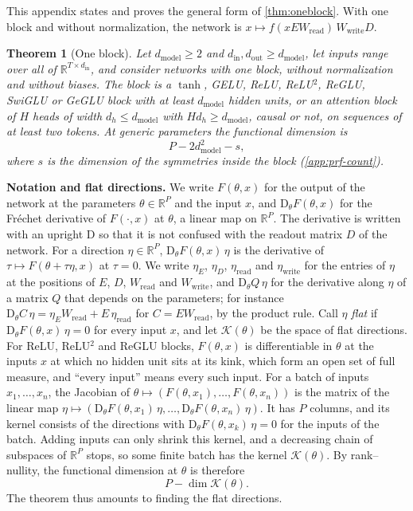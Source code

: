 \documentclass[10pt]{article}
\newtheorem{theorem}{Theorem}[section]
\theoremstyle{definition}
\theoremstyle{remark}
\newcommand{\R}{\mathbb{R}}
\newcommand{\Wread}{W_{\mathrm{read}}}
\newcommand{\Wwrite}{W_{\mathrm{write}}}
\newcommand{\dm}{d_{\mathrm{model}}}
\newcommand{\Der}{\mathrm{D}}
\newcommand{\para}[1]{\smallskip\noindent\textbf{#1}\hspace{0.5em}}
\begin{document}
This appendix states and proves the general form of \cref{thm:oneblock}. With one block and without normalization, the network is $x \mapsto f(xE\Wread)\,\Wwrite D$.

\begin{theorem}[One block]\label{thm:onelayer}
Let $\dm \ge 2$ and $d_{\mathrm{in}}, d_{\mathrm{out}} \ge \dm$, let inputs range over all of $\R^{T\times d_{\mathrm{in}}}$, and consider networks with one block, without normalization and without biases. The block is a $\tanh$, GELU, ReLU, ReLU$^2$, ReGLU, SwiGLU or GeGLU block with at least $\dm$ hidden units, or an attention block of $H$ heads of width $d_h \le \dm$ with $Hd_h \ge \dm$, causal or not, on sequences of at least two tokens. At generic parameters the functional dimension is
\[
P - 2\dm^2 - s ,
\]
where $s$ is the dimension of the symmetries inside the block (\cref{app:prf-count}).
\end{theorem}

\para{Notation and flat directions.} We write $F(\theta, x)$ for the output of the network at the parameters $\theta \in \R^P$ and the input $x$, and $\Der_\theta F(\theta, x)$ for the Fr\'echet derivative of $F(\cdot, x)$ at $\theta$, a linear map on $\R^P$. The derivative is written with an upright $\Der$ so that it is not confused with the readout matrix $D$ of the network. For a direction $\eta \in \R^P$, $\Der_\theta F(\theta, x)\,\eta$ is the derivative of $\tau \mapsto F(\theta + \tau\eta, x)$ at $\tau = 0$. We write $\eta_E$, $\eta_D$, $\eta_{\mathrm{read}}$ and $\eta_{\mathrm{write}}$ for the entries of $\eta$ at the positions of $E$, $D$, $\Wread$ and $\Wwrite$, and $\Der_\theta Q\,\eta$ for the derivative along $\eta$ of a matrix $Q$ that depends on the parameters; for instance $\Der_\theta C\,\eta = \eta_E\Wread + E\,\eta_{\mathrm{read}}$ for $C = E\Wread$, by the product rule. Call $\eta$ \emph{flat} if $\Der_\theta F(\theta, x)\,\eta = 0$ for every input $x$, and let $\mathcal K(\theta)$ be the space of flat directions. For ReLU, ReLU$^2$ and ReGLU blocks, $F(\theta, x)$ is differentiable in $\theta$ at the inputs $x$ at which no hidden unit sits at its kink, which form an open set of full measure, and ``every input'' means every such input. For a batch of inputs $x_1, \dots, x_n$, the Jacobian of $\theta \mapsto (F(\theta, x_1), \dots, F(\theta, x_n))$ is the matrix of the linear map $\eta \mapsto (\Der_\theta F(\theta, x_1)\,\eta, \dots, \Der_\theta F(\theta, x_n)\,\eta)$. It has $P$ columns, and its kernel consists of the directions with $\Der_\theta F(\theta, x_k)\,\eta = 0$ for the inputs of the batch. Adding inputs can only shrink this kernel, and a decreasing chain of subspaces of $\R^P$ stops, so some finite batch has the kernel $\mathcal K(\theta)$. By rank--nullity, the functional dimension at $\theta$ is therefore
\[
P - \dim\mathcal K(\theta).
\]
The theorem thus amounts to finding the flat directions.
\end{document}
